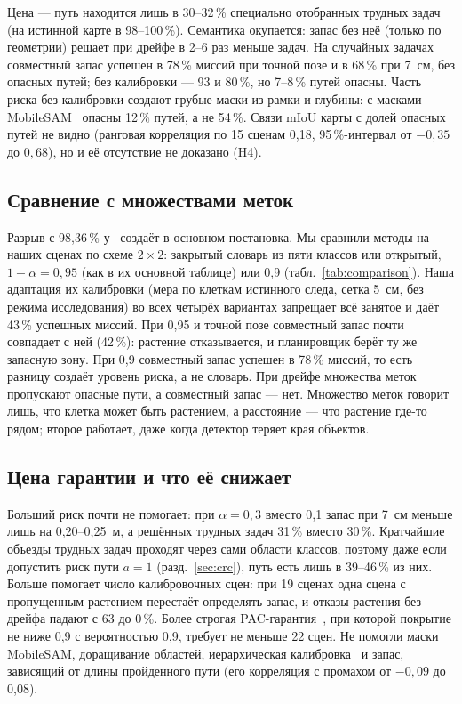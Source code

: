 \documentclass[conference,a4paper]{IEEEtran}
\theoremstyle{definition}
\begin{document}
Цена --- путь находится лишь в 30--32\,\% специально отобранных трудных задач (на истинной карте в 98--100\,\%).
Семантика окупается: запас без неё (только по геометрии) решает при дрейфе в 2--6 раз меньше задач. На случайных задачах
совместный запас успешен в 78\,\% миссий при точной позе и в 68\,\% при 7~см, без опасных путей; без калибровки ---
93 и 80\,\%, но 7--8\,\% путей опасны. Часть риска без калибровки создают грубые маски из рамки и глубины: с масками
MobileSAM~\cite{mobilesam} опасны 12\,\% путей, а не 54\,\%. Связи mIoU карты с долей опасных путей не видно (ранговая
корреляция по 15 сценам 0,18, 95\,\%-интервал от $-0{,}35$ до $0{,}68$), но и её отсутствие не доказано (H4).

\subsection{Сравнение с множествами меток}

\begin{table}[t]
\centering
\caption{Случайные задачи (420 в 21 сцене): доля успешных миссий; $^\ast$ --- есть опасные пути.}
\label{tab:comparison}
\footnotesize

\end{table}

Разрыв с 98,36\,\% у~\cite{sundarsingh} создаёт в основном постановка. Мы сравнили методы на наших сценах по схеме
$2 \times 2$: закрытый словарь из пяти классов или открытый, $1 - \alpha = 0{,}95$ (как в их основной таблице) или 0,9
(табл.~\ref{tab:comparison}). Наша адаптация их калибровки (мера по клеткам истинного следа, сетка 5~см, без режима
исследования) во всех четырёх вариантах запрещает всё занятое и даёт 43\,\% успешных миссий. При 0,95 и точной позе
совместный запас почти совпадает с ней (42\,\%): растение отказывается, и планировщик берёт ту же запасную зону. При 0,9
совместный запас успешен в 78\,\% миссий, то есть разницу создаёт уровень риска, а не словарь. При дрейфе множества меток
пропускают опасные пути, а совместный запас --- нет. Множество меток говорит лишь, что клетка может быть растением, а
расстояние --- что растение где-то рядом; второе работает, даже когда детектор теряет края объектов.

\subsection{Цена гарантии и что её снижает}

Больший риск почти не помогает: при $\alpha = 0{,}3$ вместо 0,1 запас при 7~см меньше лишь на 0,20--0,25~м, а
решённых трудных задач 31\,\% вместо 30\,\%. Кратчайшие объезды трудных задач проходят через сами области классов,
поэтому даже если допустить риск пути $a = 1$ (разд.~\ref{sec:crc}), путь есть лишь в 39--46\,\% из них. Больше помогает число калибровочных сцен: при 19
сценах одна сцена с пропущенным растением перестаёт определять запас, и отказы растения без дрейфа падают с 63 до 0\,\%.
Более строгая PAC-гарантия~\cite{vovk}, при которой покрытие не ниже 0,9 с вероятностью 0,9, требует не меньше 22 сцен. Не
помогли маски MobileSAM, доращивание областей, иерархическая калибровка~\cite{hcp} и запас, зависящий от длины
пройденного пути (его корреляция с промахом от $-0{,}09$ до 0,08).
\end{document}
